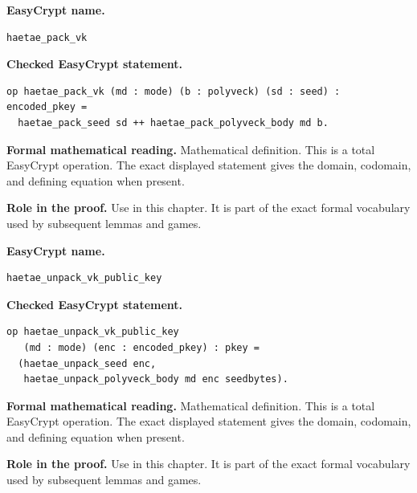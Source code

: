 \begin{formaldefinition}
\noindent\textbf{EasyCrypt name.}
\begin{lstlisting}[language=EasyCrypt,basicstyle=\ttfamily\scriptsize]
haetae_pack_vk
\end{lstlisting}
\noindent\textbf{Checked EasyCrypt statement.}
\begin{lstlisting}[language=EasyCrypt,basicstyle=\ttfamily\scriptsize]
op haetae_pack_vk (md : mode) (b : polyveck) (sd : seed) : encoded_pkey =
  haetae_pack_seed sd ++ haetae_pack_polyveck_body md b.
\end{lstlisting}
\noindent\textbf{Formal mathematical reading.}
Mathematical definition. This is a total EasyCrypt operation.  The exact displayed statement gives the domain, codomain, and defining equation when present.

\noindent\textbf{Role in the proof.}
Use in this chapter. It is part of the exact formal vocabulary used by subsequent lemmas and games.

\end{formaldefinition}

\begin{formaldefinition}
\noindent\textbf{EasyCrypt name.}
\begin{lstlisting}[language=EasyCrypt,basicstyle=\ttfamily\scriptsize]
haetae_unpack_vk_public_key
\end{lstlisting}
\noindent\textbf{Checked EasyCrypt statement.}
\begin{lstlisting}[language=EasyCrypt,basicstyle=\ttfamily\scriptsize]
op haetae_unpack_vk_public_key
   (md : mode) (enc : encoded_pkey) : pkey =
  (haetae_unpack_seed enc,
   haetae_unpack_polyveck_body md enc seedbytes).
\end{lstlisting}
\noindent\textbf{Formal mathematical reading.}
Mathematical definition. This is a total EasyCrypt operation.  The exact displayed statement gives the domain, codomain, and defining equation when present.

\noindent\textbf{Role in the proof.}
Use in this chapter. It is part of the exact formal vocabulary used by subsequent lemmas and games.

\end{formaldefinition}


